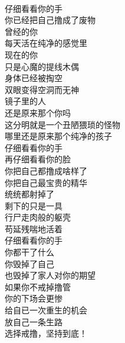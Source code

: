 \begin{poem}[戒撸是金]
    \begin{multicols}{3}
        \centering~\\
        仔细看看你的手 \\ 你已经把自己撸成了废物 \\ 曾经的你 \\ 每天活在纯净的感觉里 \\ 现在的你 \\ 只是心魔的提线木偶 \\ 身体已经被掏空 \\ 双眼变得空洞而无神 \\ 镜子里的人 \\ 还是原来那个你吗 \\ 这分明就是一个丑陋猥琐的怪物 \\ 哪里还是原来那个纯净的孩子 \\ 仔细看看你的手 \\ 再仔细看看你的脸 \\ 你把自己都撸成啥样了 \\ 你把自己最宝贵的精华 \\ 统统都射掉了 \\ 剩下的只是一具 \\ 行尸走肉般的躯壳 \\ 苟延残喘地活着 \\ 仔细看看你的手 \\ 你都干了什么 \\ 你毁掉了自己 \\ 也毁掉了家人对你的期望 \\ 如果你不戒掉撸管 \\ 你的下场会更惨 \\ 给自已一次重生的机会 \\ 放自己一条生路 \\ 选择戒撸，坚持到底！
    \end{multicols}
\end{poem}
